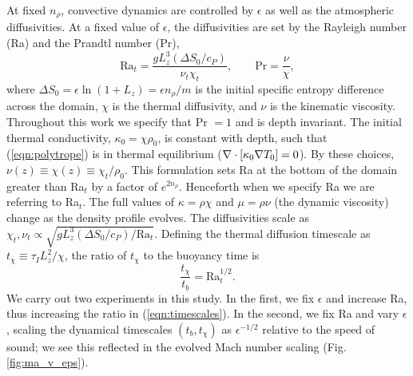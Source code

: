 At fixed $n_\rho$, convective dynamics are controlled by $\epsilon$ as well as the atmospheric diffusivities.
At a fixed value of $\epsilon$, the diffusivities are set by the Rayleigh number (Ra) and the Prandtl number (Pr),
\begin{equation}
\text{Ra}_{t} = \frac{g L_z^3 (\Delta S_0 / c_P)}{\nu_t\chi_t},
\qquad
\text{Pr} = \frac{\nu}{\chi},
\end{equation}
where $\Delta S_0 = \epsilon\ln (1 + L_z) = \epsilon n_\rho / m$ is the initial specific entropy difference across the domain, $\chi$ is the thermal diffusivity, and $\nu$ is the kinematic viscosity.
Throughout this work we specify that Pr $= 1$ and is depth invariant.
The initial thermal conductivity, $\kappa_0 = \chi \rho_0$, is constant with depth, such that (\ref{eqn:polytrope}) is in thermal equilibrium ($\nabla\cdot[\kappa_0\nabla T_0] = 0$).
By these choices, $\nu(z) \equiv \chi(z) \equiv \chi_t / \rho_0$.
This formulation sets Ra at the bottom of the domain greater than Ra$_t$ by a factor of $e^{2n_\rho}$. 
Henceforth when we specify Ra we are referring to Ra$_t$.  
The full values of $\kappa = \rho\chi$ and $\mu = \rho\nu$ (the dynamic viscosity) change as the density profile evolves.  
The diffusivities scale as $\chi_t, \nu_t \propto \sqrt{g L_z^3 (\Delta S_0 / c_P) / \text{Ra}_t}$.
Defining the thermal diffusion timescale as $t_\chi \equiv \tau_IL_z^2 / \chi$, the ratio of $t_\chi$ to the buoyancy time is
\begin{equation}
\frac{t_\chi}{t_b} =\text{Ra}_t^{1/2}.
\label{eqn:timescales}
\end{equation}
We carry out two experiments in this study. 
In the first, we fix $\epsilon$ and increase Ra, thus increasing the ratio in (\ref{eqn:timescales}). 
In the second, we fix Ra and vary $\epsilon$, scaling the dynamical timescales $(t_b, t_\chi)$ as $\epsilon^{-1/2}$ relative to the speed of sound; we see this reflected in the evolved Mach number scaling (Fig. \ref{fig:ma_v_eps}).

